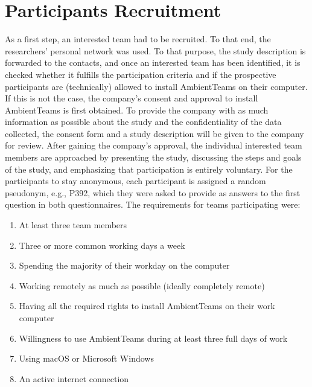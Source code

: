 \section{Participants Recruitment}
\label{section:recruitment}
As a first step, an interested team had to be recruited. To that end, the researchers' personal network was used. To that purpose, the study description is forwarded to the contacts, and once an interested team has been identified, it is checked whether it fulfills the participation criteria and if the prospective participants are (technically) allowed to install AmbientTeams on their computer. If this is not the case, the company's consent and approval to install AmbientTeams is first obtained. To provide the company with as much information as possible about the study and the confidentiality of the data collected, the consent form and a study description will be given to the company for review. After gaining the company's approval, the individual interested team members are approached by presenting the study, discussing the steps and goals of the study, and emphasizing that participation is entirely voluntary. For the participants to stay anonymous, each participant is assigned a random pseudonym, e.g., P392, which they were asked to provide as answers to the first question in both questionnaires. The requirements for teams participating were:

\begin{enumerate}
    \item At least three team members
    \item Three or more common working days a week
    \item Spending the majority of their workday on the computer
    \item Working remotely as much as possible (ideally completely remote)
    \item Having all the required rights to install AmbientTeams on their work computer
    \item Willingness to use AmbientTeams during at least three full days of work
    \item Using macOS or Microsoft Windows
    \item An active internet connection
\end{enumerate}


